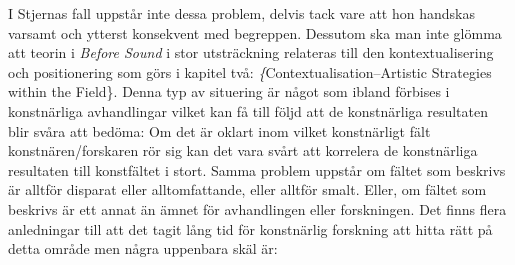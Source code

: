 \documentclass[11pt]{article}
\begin{document}
I Stjernas fall uppstår inte dessa problem, delvis tack vare att hon
handskas varsamt och ytterst konsekvent med begreppen. Dessutom ska
man inte glömma att teorin i \emph{Before Sound} i stor utsträckning
relateras till den kontextualisering och positionering som görs i
kapitel två: \emph\{Contextualisation--Artistic Strategies within the
    Field\}. Denna typ av situering är något som ibland förbises i
konstnärliga avhandlingar vilket kan få till följd att de konstnärliga
resultaten blir svåra att bedöma: Om det är oklart inom vilket
konstnärligt fält konstnären/forskaren rör sig kan det vara svårt att
korrelera de konstnärliga resultaten till konstfältet i stort. Samma
problem uppstår om fältet som beskrivs är alltför disparat eller
alltomfattande, eller alltför smalt. Eller, om fältet som beskrivs är
ett annat än ämnet för avhandlingen eller forskningen. Det finns flera
anledningar till att det tagit lång tid för konstnärlig forskning att
hitta rätt på detta område men några uppenbara skäl är:
\end{document}
